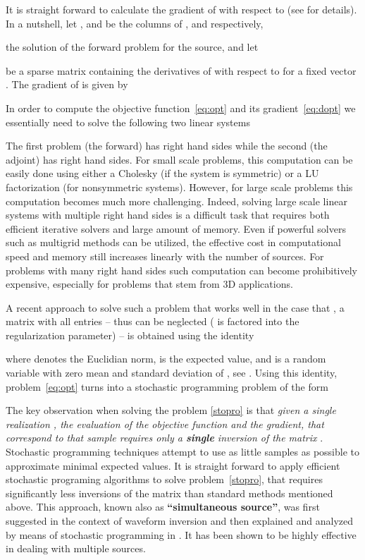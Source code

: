 \documentclass[12pt]{article}
\begin{document}
It is straight forward to calculate the gradient of  with respect to  (see \cite{hao} for details). In a nutshell, let ,  and  be the  columns of ,  and  respectively,

the solution of the forward problem for the  source, and let

be a sparse matrix containing the derivatives of  with respect to  for a fixed vector . The gradient of  is given by


In order to compute the objective function~\eqref{eq:opt} and its gradient~\eqref{eq:dopt} we essentially need to solve the following two linear systems

The first problem (the forward) has  right hand sides while the second (the adjoint) has  right hand sides. For small scale problems, this computation can be easily done using either a Cholesky (if the system is symmetric) or a LU factorization (for nonsymmetric systems). However, for large scale problems this computation becomes much more challenging. Indeed, solving large scale linear systems with multiple right hand sides is a difficult task that requires both efficient iterative solvers and large amount of memory. Even if powerful solvers such as multigrid methods can be utilized, the effective cost in computational speed and memory still increases linearly with the number of sources. For problems with many right hand sides such computation can become prohibitively expensive, especially for problems that stem from 3D applications.

\bigskip

A recent approach to solve such a problem that works well in the case that , a matrix with all entries  -- thus can be neglected ( is factored into the regularization parameter) -- is obtained using the identity

where  denotes the Euclidian norm,  is the expected value, and  is a random variable with zero mean and standard deviation of , see \cite{HaberChungHerrmann2011}. Using this identity, problem~\eqref{eq:opt} turns into a stochastic programming problem of the form

The key observation when solving the problem \eqref{stopro} is that {\em given a single realization , the evaluation of the objective function and the gradient, that correspond to that sample requires only a {\bf single} inversion of the matrix }.
Stochastic programming techniques attempt to use as little samples as possible to approximate minimal expected values. It is straight forward to apply efficient stochastic programing algorithms to solve problem~\eqref{stopro}, that requires significantly less inversions of the matrix  than standard methods mentioned above.
This approach, known also as {\bf``simultaneous source''}, was first suggested in the context of waveform inversion \cite{RohmbergGeop2010,krebs09ffw,neelamani08dos,LeeuwenAravkinHerrmann2011} and then explained and analyzed by means of stochastic programming in \cite{HaberChungHerrmann2011}. It has been shown to be highly effective in dealing with multiple sources.
\end{document}
